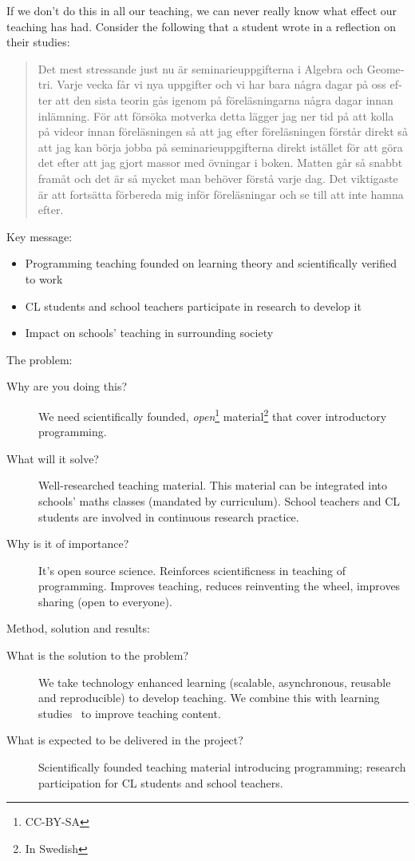 If we don't do this in all our teaching, we can never really know what effect 
our teaching has had.
Consider the following that a student wrote in a reflection on their studies:
\foreignblockquote{swedish}{Det mest stressande just nu är seminarieuppgifterna 
  i Algebra och Geometri.
  Varje vecka får vi nya uppgifter och vi har bara några dagar på oss efter att 
  den sista teorin gås igenom på föreläsningarna några dagar innan inlämning.
  För att försöka motverka detta lägger jag ner tid på att kolla på videor
  innan föreläsningen så att jag efter föreläsningen förstår direkt så att jag 
  kan börja jobba på seminarieuppgifterna direkt istället för att göra det 
  efter att jag gjort massor med övningar i boken.
  Matten går så snabbt framåt och det är så mycket man behöver förstå varje 
  dag.
  Det viktigaste är att fortsätta förbereda mig inför föreläsningar och se till 
att inte hamna efter.}


Key message:
\begin{itemize}
  \item Programming teaching founded on learning theory and scientifically 
    verified to work

  \item CL students and school teachers participate in research to develop it

  \item Impact on schools' teaching in surrounding society
\end{itemize}

The problem:
\begin{description}
  \item[Why are you doing this?]
    We need scientifically founded, \emph{open}\footnote{CC-BY-SA} 
    material\footnote{In Swedish} that cover introductory programming.

  \item[What will it solve?]
    Well-researched teaching material.
    This material can be integrated into schools’ maths classes (mandated by 
    curriculum).
    School teachers and CL students are involved in continuous research 
    practice.

  \item[Why is it of importance?]
    It's open source science.
    Reinforces scientificness in teaching of programming.
    Improves teaching, reduces reinventing the wheel, improves sharing (open to 
    everyone).
\end{description}

Method, solution and results:
\begin{description}
  \item[What is the solution to the problem?]
    We take technology enhanced learning (scalable, asynchronous, reusable and 
    reproducible) to develop teaching.
    We combine this with learning studies~\cite{LearningStudy} to improve 
    teaching content.

  \item[What is expected to be delivered in the project?]
    Scientifically founded teaching material introducing programming;
    research participation for CL students and school teachers.
\end{description}

